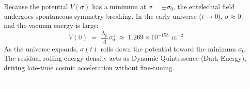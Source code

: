 \documentclass[
    12pt,
    a4paper,
    headings=normal,
    twoside=false,
    open=any,
    parskip=half
]{scrbook}
\begin{document}
\begin{physscholion}
Because the potential $V(\sigma)$ has a minimum at $\sigma = \pm \sigma_0$, the entelechial field undergoes spontaneous symmetry breaking. In the early universe ($t \to 0$), $\sigma \approx 0$, and the vacuum energy is large:
\begin{equation*}
V(0) \;=\; \frac{\lambda_\sigma}{4} \sigma_0^4 \;\approx\; 1.269 \times 10^{-158} \text{ m}^{-2}
\end{equation*}
As the universe expands, $\sigma(t)$ rolls down the potential toward the minimum $\sigma_0$. The residual rolling energy density acts as Dynamic Quintessence (Dark Energy), driving late-time cosmic acceleration without fine-tuning.
\end{physscholion}

---
\end{document}
